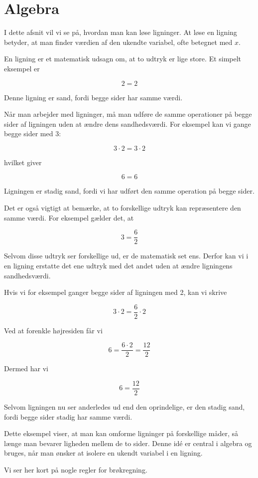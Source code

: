 \section{Algebra}

I dette afsnit vil vi se på, hvordan man kan løse ligninger. At løse en ligning betyder, at man finder værdien af den ukendte variabel, ofte betegnet med $x$.

En ligning er et matematisk udsagn om, at to udtryk er lige store. Et simpelt eksempel er

\[
2 = 2
\]

Denne ligning er sand, fordi begge sider har samme værdi.

Når man arbejder med ligninger, må man udføre de samme operationer på begge sider af ligningen uden at ændre dens sandhedsværdi. For eksempel kan vi gange begge sider med 3:

\[
3\cdot2 = 3\cdot2
\]

hvilket giver

\[
6 = 6
\]

Ligningen er stadig sand, fordi vi har udført den samme operation på begge sider.

Det er også vigtigt at bemærke, at to forskellige udtryk kan repræsentere den samme værdi. For eksempel gælder det, at

\[
3 = \frac{6}{2}
\]

Selvom disse udtryk ser forskellige ud, er de matematisk set ens. Derfor kan vi i en ligning erstatte det ene udtryk med det andet uden at ændre ligningens sandhedsværdi.

Hvis vi for eksempel ganger begge sider af ligningen med 2, kan vi skrive

\[
3\cdot2 = \frac{6}{2}\cdot2
\]

Ved at forenkle højresiden får vi

\[
6 = \frac{6\cdot2}{2} = \frac{12}{2}
\]

Dermed har vi

\[
6 = \frac{12}{2}
\]

Selvom ligningen nu ser anderledes ud end den oprindelige, er den stadig sand, fordi begge sider stadig har samme værdi.

Dette eksempel viser, at man kan omforme ligninger på forskellige måder, så længe man bevarer ligheden mellem de to sider. Denne idé er central i algebra og bruges, når man ønsker at isolere en ukendt variabel i en ligning.

Vi ser her kort på nogle regler for brøkregning.

